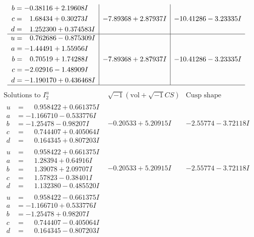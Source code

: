 \documentclass[1p]{elsarticle_modified}
\theoremstyle{definition}
\newcommand{\I}{\sqrt{-1}}
\begin{document}
$$\begin{array}{c|c|c}
\begin{aligned}
b &= -0.38116 + 2.19608 I \\
c &= \phantom{-}1.68434 + 0.30273 I \\
d &= \phantom{-}1.252300 + 0.374583 I\end{aligned}
 & -7.89368 + 2.87937 I & -10.41286 - 3.23335 I \\ \hline\begin{aligned}
u &= \phantom{-}0.762686 - 0.875309 I \\
a &= -1.44491 + 1.55956 I \\
b &= \phantom{-}0.70519 + 1.74288 I \\
c &= -2.02916 - 1.48909 I \\
d &= -1.190170 + 0.436468 I\end{aligned}
 & -7.89368 + 2.87937 I & -10.41286 - 3.23335 I\\
 \hline 
 \end{array}$$\newpage$$\begin{array}{c|c|c}  
\text{Solutions to }I^u_{2}& \I (\text{vol} + \sqrt{-1}CS) & \text{Cusp shape}\\
 \hline 
\begin{aligned}
u &= \phantom{-}0.958422 + 0.661375 I \\
a &= -1.166710 - 0.533776 I \\
b &= -1.25478 - 0.98207 I \\
c &= \phantom{-}0.744407 + 0.405064 I \\
d &= \phantom{-}0.164345 + 0.807203 I\end{aligned}
 & -0.20533 + 5.20915 I & -2.55774 - 3.72118 I \\ \hline\begin{aligned}
u &= \phantom{-}0.958422 + 0.661375 I \\
a &= \phantom{-}1.28394 + 0.64916 I \\
b &= \phantom{-}1.39078 + 2.09707 I \\
c &= \phantom{-}1.57823 - 0.38401 I \\
d &= \phantom{-}1.132380 - 0.485520 I\end{aligned}
 & -0.20533 + 5.20915 I & -2.55774 - 3.72118 I \\ \hline\begin{aligned}
u &= \phantom{-}0.958422 - 0.661375 I \\
a &= -1.166710 + 0.533776 I \\
b &= -1.25478 + 0.98207 I \\
c &= \phantom{-}0.744407 - 0.405064 I \\
d &= \phantom{-}0.164345 - 0.807203 I\end{aligned}

\end{array}$$
\end{document}
